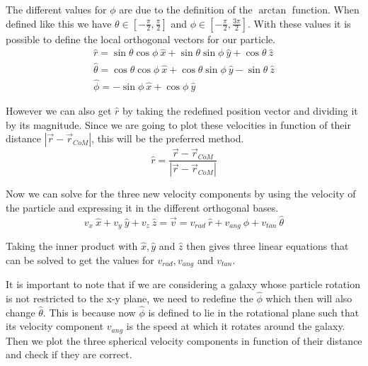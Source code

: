 \documentclass[a4paper,12pt, english]{article}
\begin{document}
\smallskip
The different values for $\phi$ are due to the definition of the \(\arctan\) function. When defined like this we have $\theta \in [-\frac{\pi}{2}, \frac{\pi}{2}]$ and $\phi \in [-\frac{\pi}{2}, \frac{3\pi}{2}]$. With these values it is possible to define the local orthogonal vectors for our particle. 
\begin{equation}
\begin{gathered}
\hat{r} = \sin\theta\cos\phi \ \hat{x} + \sin\theta\sin\phi \ \hat{y} + \cos\theta \ \hat{z} \\
\hat{\theta} = \cos\theta\cos\phi \ \hat{x} + \cos\theta\sin\phi \ \hat{y} - \sin\theta \ \hat{z} \\
\hat{\phi} = -\sin\phi \ \hat{x} + \cos\phi \ \hat{y}
\end{gathered}
\end{equation}\par
\smallskip
However we can also get $\hat{r}$ by taking the redefined position vector and dividing it by its magnitude. Since we are going to plot these velocities in function of their distance $|\vec{r}-\vec{r}_{CoM}|$, this will be the preferred method.  
\begin{equation}
    \hat{r} = \frac{\vec{r}-\vec{r}_{CoM}}{|\vec{r}-\vec{r}_{CoM}|}
\end{equation}\par
\smallskip
Now we can solve for the three new velocity components by using the velocity of the particle and expressing it in the different orthogonal bases.
\begin{equation}
    v_x \ \hat{x} + v_y \ \hat{y} + v_z \ \hat{z} = \vec{v} = v_{rad} \ \hat{r} + v_{ang} \ \hat{\phi} + v_{tan} \ \hat{\theta}
\end{equation}\par
\smallskip
Taking the inner product with $\hat{x}, \hat{y}$ and $\hat{z}$ then gives three linear equations that can be solved to get the values for $v_{rad}, v_{ang}$ and $v_{tan}$.\par
\smallskip
It is important to note that if we are considering a galaxy whose particle rotation is not restricted to the x-y plane, we need to redefine the $\hat{\phi}$ which then will also change $\hat{\theta}$. This is because now $\hat{\phi}$ is defined to lie in the rotational plane such that its velocity component $v_{ang}$ is the speed at which it rotates around the galaxy. Then we plot the three spherical velocity components in function of their distance and check if they are correct.\par
\end{document}
